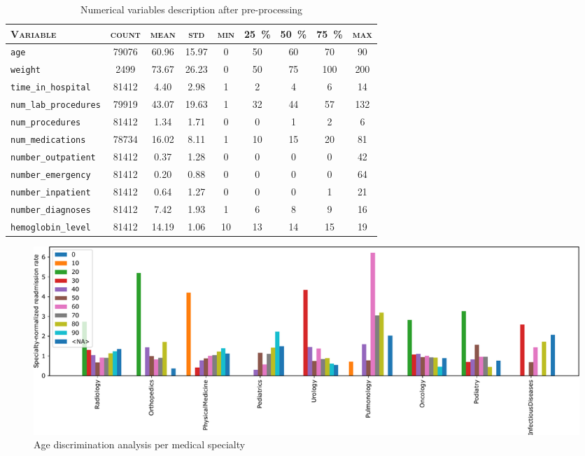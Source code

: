 \documentclass[a4paper,11pt]{article}
\newcommand{\age}{\texttt{age}\xspace}
\newcommand{\weight}{\texttt{weight}\xspace}
\newcommand{\timeInHospital}{\texttt{time\_in\_hospital}\xspace}
\newcommand{\numLabProcedures}{\texttt{num\_lab\_procedures}\xspace}
\newcommand{\numProcedures}{\texttt{num\_procedures}\xspace}
\newcommand{\numMedications}{\texttt{num\_medications}\xspace}
\newcommand{\numberOutpatient}{\texttt{number\_outpatient}\xspace}
\newcommand{\numberEmergency}{\texttt{number\_emergency}\xspace}
\newcommand{\numberInpatient}{\texttt{number\_inpatient}\xspace}
\newcommand{\numberDiagnoses}{\texttt{number\_diagnoses}\xspace}
\newcommand{\hemoglobinLevel}{\texttt{hemoglobin\_level}\xspace}
\begin{document}
\begin{table}[H]
\caption{Numerical variables description after pre-processing }
\label{tab:dataset_describe}
\centering
\begin{tabularx}{\textwidth}{Xcccccccc}
\toprule
\textsc{Variable} &  \textsc{count} &   \textsc{mean} &    \textsc{std} & \textsc{min} & \textsc{\SI{25}{\percent}} & \textsc{\SI{50}{\percent}} &  \textsc{\SI{75}{\percent}} &  \textsc{max} \\
\midrule
\age                &  79076 &  60.96 &  15.97 &   0 &  50 &  60 &   70 &   90 \\
\weight             &   2499 &  73.67 &  26.23 &   0 &  50 &  75 &  100 &  200 \\
\timeInHospital   &  81412 &   4.40 &   2.98 &   1 &   2 &   4 &    6 &   14 \\
\numLabProcedures &  79919 &  43.07 &  19.63 &   1 &  32 &  44 &   57 &  132 \\
\numProcedures     &  81412 &   1.34 &   1.71 &   0 &   0 &   1 &    2 &    6 \\
\numMedications    &  78734 &  16.02 &   8.11 &   1 &  10 &  15 &   20 &   81 \\
\numberOutpatient  &  81412 &   0.37 &   1.28 &   0 &   0 &   0 &    0 &   42 \\
\numberEmergency   &  81412 &   0.20 &   0.88 &   0 &   0 &   0 &    0 &   64 \\
\numberInpatient   &  81412 &   0.64 &   1.27 &   0 &   0 &   0 &    1 &   21 \\
\numberDiagnoses   &  81412 &   7.42 &   1.93 &   1 &   6 &   8 &    9 &   16 \\
\hemoglobinLevel   &  81412 &  14.19 &   1.06 &  10 &  13 &  14 &   15 &   19 \\
\bottomrule
\end{tabularx}
\end{table}

\label{subsection:business_tech_analysis}





\begin{figure}[!htb]
	\centering
	\includegraphics[width=1\textwidth]{images/descrimination_histogram_age.pdf}
	\caption{Age discrimination analysis per medical specialty}
	\label{fig:discrimination_histogram_age}
\end{figure}
\end{document}
